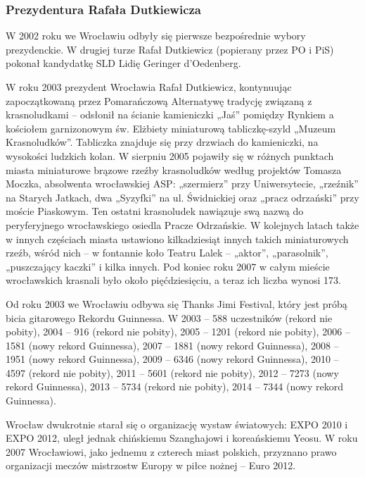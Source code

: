 \documentclass{article}
\begin{document}
\subsubsection{Prezydentura Rafała Dutkiewicza}

W 2002 roku we Wrocławiu odbyły się pierwsze bezpośrednie wybory prezydenckie. W drugiej turze Rafał Dutkiewicz (popierany przez PO i PiS) pokonał kandydatkę SLD Lidię Geringer d’Oedenberg.

W roku 2003 prezydent Wrocławia Rafał Dutkiewicz, kontynuując zapoczątkowaną przez Pomarańczową Alternatywę tradycję związaną z krasnoludkami – odsłonił na ścianie kamieniczki „Jaś” pomiędzy Rynkiem a kościołem garnizonowym św. Elżbiety miniaturową tabliczkę-szyld „Muzeum Krasnoludków”. Tabliczka znajduje się przy drzwiach do kamieniczki, na wysokości ludzkich kolan. W sierpniu 2005 pojawiły się w różnych punktach miasta miniaturowe brązowe rzeźby krasnoludków według projektów Tomasza Moczka, absolwenta wrocławskiej ASP: „szermierz” przy Uniwersytecie, „rzeźnik” na Starych Jatkach, dwa „Syzyfki” na ul. Świdnickiej oraz „pracz odrzański” przy moście Piaskowym. Ten ostatni krasnoludek nawiązuje swą nazwą do peryferyjnego wrocławskiego osiedla Pracze Odrzańskie. W kolejnych latach także w innych częściach miasta ustawiono kilkadziesiąt innych takich miniaturowych rzeźb, wśród nich – w fontannie koło Teatru Lalek – „aktor”, „parasolnik”, „puszczający kaczki” i kilka innych. Pod koniec roku 2007 w całym mieście wrocławskich krasnali było około pięćdziesięciu, a teraz ich liczba wynosi 173.

Od roku 2003 we Wrocławiu odbywa się Thanks Jimi Festival, który jest próbą bicia gitarowego Rekordu Guinnessa. W 2003 – 588 uczestników (rekord nie pobity), 2004 – 916 (rekord nie pobity), 2005 – 1201 (rekord nie pobity), 2006 – 1581 (nowy rekord Guinnessa), 2007 – 1881 (nowy rekord Guinnessa), 2008 – 1951 (nowy rekord Guinnessa), 2009 – 6346 (nowy rekord Guinnessa), 2010 – 4597 (rekord nie pobity), 2011 – 5601 (rekord nie pobity), 2012 – 7273 (nowy rekord Guinnessa), 2013 – 5734 (rekord nie pobity), 2014 – 7344 (nowy rekord Guinnessa).

Wrocław dwukrotnie starał się o organizację wystaw światowych: EXPO 2010 i EXPO 2012, uległ jednak chińskiemu Szanghajowi i koreańskiemu Yeosu. W roku 2007 Wrocławiowi, jako jednemu z czterech miast polskich, przyznano prawo organizacji meczów mistrzostw Europy w piłce nożnej – Euro 2012.
\end{document}
